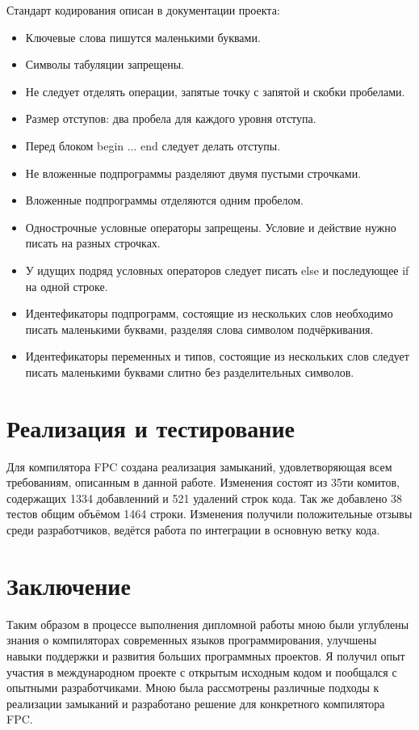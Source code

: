 \documentclass{imcs}
\begin{document}
Стандарт кодирования описан в документации проекта\cite{codingstyle}:
\begin{itemize}
  \item Ключевые слова пишутся маленькими буквами.
  \item Символы табуляции запрещены.
  \item Не следует отделять операции, запятые точку с запятой и скобки пробелами.
  \item Размер отступов: два пробела для каждого уровня отступа.
  \item Перед блоком begin ... end следует делать отступы.
  \item Не вложенные подпрограммы разделяют двумя пустыми строчками.
  \item Вложенные подпрограммы отделяются одним пробелом.
  \item Однострочные условные операторы запрещены. Условие и действие нужно писать на разных строчках.
  \item У идущих подряд условных операторов следует писать else и последующее if 
    на одной строке.
  \item Идентефикаторы подпрограмм, состоящие из нескольких слов необходимо писать
    маленькими буквами, разделяя слова символом подчёркивания.
  \item Идентефикаторы переменных и типов, состоящие из нескольких слов следует писать
    маленькими буквами слитно без разделительных символов.
\end{itemize}

\section{Реализация и тестирование}

Для компилятора FPC создана реализация замыканий, удовлетворяющая всем требованиям, описанным в данной работе.
Изменения состоят из 35ти комитов, содержащих 1334 добавленний и 521 удалений строк кода.
Так же добавлено 38 тестов общим объёмом 1464 строки. Изменения получили положительные отзывы
среди разработчиков, ведётся работа по интеграции в основную ветку кода\cite{mantis}.

\pagebreak

\section*{Заключение}

Таким образом в процессе выполнения дипломной работы мною были углублены
знания о компиляторах современных языков программирования, улучшены навыки
поддержки и развития больших программных проектов. Я получил опыт участия в 
международном проекте с открытым исходным кодом и пообщался с опытными разработчиками.
Мною была рассмотрены различные подходы к реализации замыканий и разработано
решение для конкретного компилятора FPC.
\end{document}
